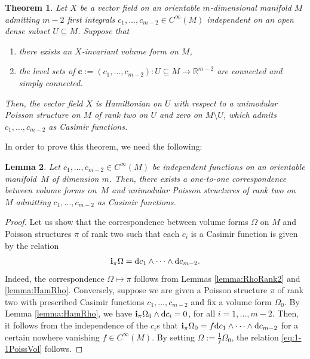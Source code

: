 \documentclass[10pt,a4paper]{amsart}
\newcommand{\R}[1]{\mathbb{R}^{#1}}
\newcommand{\dd}{{\rm d}}
\newcommand{\ii}{\mathbf{i}}
\numberwithin{equation}{section}
\newtheorem{Theorem}{Theorem}[section]
\newtheorem{Lemma}[Theorem]{Lemma}
\begin{document}
\begin{Theorem}\label{teo:VolHam}
Let $X$ be a vector field on an orientable $m$-dimensional manifold $M$ admitting $m-2$ first integrals $c_1, \dots, c_{m-2} \in C^{\infty}(M)$ independent on an open dense subset $U \subseteq M$. Suppose that
 \begin{enumerate}\itemsep=0pt
 \item[$1)$] there exists an $X$-invariant volume form on $M$,
 \item[$2)$] the level sets of $\boldsymbol{c}:=(c_1,\dots,c_{m-2})\colon U \subseteq M \to \R{m-2}$ are connected and simply connected.
 \end{enumerate}
Then, the vector field $X$ is Hamiltonian on $U$ with respect to a unimodular Poisson structure on $M$ of rank two on $U$ and zero on $M \setminus U$, which admits $c_1,\dots,c_{m-2}$ as Casimir functions.
\end{Theorem}

In order to prove this theorem, we need the following:

\begin{Lemma}\label{lemma:1-1PoissVol}
Let $c_1,\dots,c_{m-2} \in C^{\infty}(M)$ be independent functions on an orientable manifold~$M$ of dimension $m$. Then, there exists a one-to-one correspondence between volume forms on~$M$ and unimodular Poisson structures of rank two on $M$ admitting $c_1,\dots,c_{m-2}$ as Casimir functions.
\end{Lemma}
\begin{proof}
Let us show that the correspondence between volume forms $\Omega$ on $M$ and Poisson structures $\pi$ of rank two such that each $c_i$ is a Casimir function is given by the relation
 \begin{equation}\label{eq:1-1PoissVol}
 \ii_{\pi}\Omega = \dd c_1 \wedge \cdots \wedge \dd c_{m-2}.
 \end{equation}
Indeed, the correspondence $\Omega \mapsto \pi$ follows from Lemmas \ref{lemma:RhoRank2} and \ref{lemma:HamRho}. Conversely, suppose we are given a Poisson structure $\pi$ of rank two with prescribed Casimir functions $c_1,\dots,c_{m-2}$ and fix a volume form $\Omega_0$. By Lemma \ref{lemma:HamRho}, we have $\ii_{\pi}\Omega_{0} \wedge \dd c_{i} = 0$, for all $i = 1,\dots,m-2$. Then, it follows from the independence of the $c_{i}$s that $\ii_{\pi}\Omega_{0} = f \dd c_1 \wedge \cdots \wedge \dd c_{m-2}$ for a certain nowhere vanishing $f \in C^{\infty}(M)$. By setting $\Omega := \tfrac{1}{f}\Omega_{0}$, the relation \eqref{eq:1-1PoissVol} follows.
\end{proof}
\end{document}
